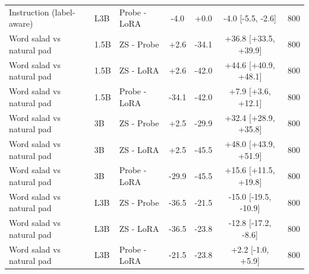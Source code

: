 \begin{table}[t]
\begin{tabular}{lllcccc}
Instruction (label-aware) & L3B & Probe - LoRA & -4.0 & +0.0 & -4.0 [-5.5, -2.6] & 800 \\
Word salad vs natural pad & 1.5B & ZS - Probe & +2.6 & -34.1 & +36.8 [+33.5, +39.9] & 800 \\
Word salad vs natural pad & 1.5B & ZS - LoRA & +2.6 & -42.0 & +44.6 [+40.9, +48.1] & 800 \\
Word salad vs natural pad & 1.5B & Probe - LoRA & -34.1 & -42.0 & +7.9 [+3.6, +12.1] & 800 \\
Word salad vs natural pad & 3B & ZS - Probe & +2.5 & -29.9 & +32.4 [+28.9, +35.8] & 800 \\
Word salad vs natural pad & 3B & ZS - LoRA & +2.5 & -45.5 & +48.0 [+43.9, +51.9] & 800 \\
Word salad vs natural pad & 3B & Probe - LoRA & -29.9 & -45.5 & +15.6 [+11.5, +19.8] & 800 \\
Word salad vs natural pad & L3B & ZS - Probe & -36.5 & -21.5 & -15.0 [-19.5, -10.9] & 800 \\
Word salad vs natural pad & L3B & ZS - LoRA & -36.5 & -23.8 & -12.8 [-17.2, -8.6] & 800 \\
Word salad vs natural pad & L3B & Probe - LoRA & -21.5 & -23.8 & +2.2 [-1.0, +5.9] & 800 \\
\bottomrule
\end{tabular}
\end{table}